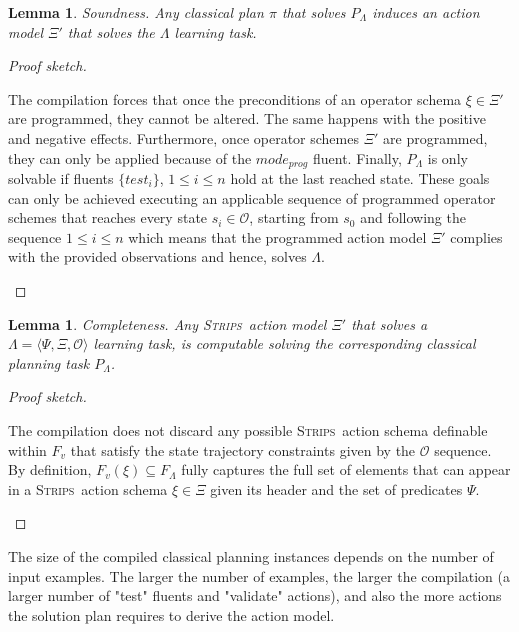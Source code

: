 \documentclass{article}
\newcommand{\tup}[1]{{\langle #1 \rangle}}
\newcommand{\strips}{\textsc{Strips}}     %
\newtheorem{lemma}[theorem]{Lemma}
\begin{document}
\begin{lemma}
Soundness. Any classical plan $\pi$ that solves $P_{\Lambda}$ induces an action model $\Xi'$ that solves the $\Lambda$ learning task.
\end{lemma}

\begin{proof}[Proof sketch]
\begin{small}
The compilation forces that once the preconditions of an operator schema $\xi \in \Xi'$ are programmed, they cannot be altered. The same happens with the positive and negative effects. Furthermore, once operator schemes $\Xi'$ are programmed, they can only be applied because of the $mode_{prog}$ fluent. Finally, $P_{\Lambda}$ is only solvable if fluents $\{test_i\}$, {\small $1\leq i\leq n$} hold at the last reached state. These goals can only be achieved executing an applicable sequence of programmed operator schemes that reaches every state $s_i\in\mathcal{O}$, starting from $s_0$ and following the sequence {\small $1\leq i\leq n$} which means that the programmed action model $\Xi'$ complies with the provided observations and hence, solves $\Lambda$.
\end{small}
\end{proof}


\begin{lemma}
Completeness. Any \strips\ action model $\Xi'$ that solves a $\Lambda=\tup{\Psi,\Xi,\mathcal{O}}$ learning task, is computable solving the corresponding classical planning task $P_{\Lambda}$.
\end{lemma}

\begin{proof}[Proof sketch]
\begin{small}
The compilation does not discard any possible \strips\ action schema definable within $F_v$ that satisfy the state trajectory constraints given by the $\mathcal{O}$ sequence. By definition, $F_v(\xi)\subseteq F_\Lambda$ fully captures the full set of elements that can appear in a \strips\ action schema $\xi\in\Xi$ given its header and the set of predicates $\Psi$. 
\end{small}
\end{proof}

The size of the compiled classical planning instances depends on the number of input examples. The larger the number of examples, the larger the compilation (a larger number of "test" fluents and "validate" actions), and also the more actions the solution plan requires to derive the action model.  
\end{document}
